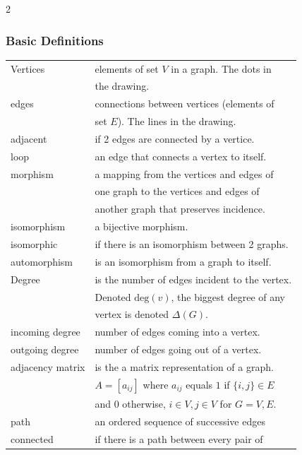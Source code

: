 \documentclass[5pt]{article}
\begin{document}
\begin{multicols}{2}
\subsubsection{Basic Definitions}
\begin{tabular}{ll}
    Vertices            & elements of set $V$ in a graph. The dots in\\
                        & the drawing.\\
    edges               & connections between vertices (elements of\\
                        & set $E$). The lines in the drawing.\\
    adjacent            & if 2 edges are connected by a vertice.\\
    loop                & an edge that connects a vertex to itself.\\
    morphism            & a mapping from the vertices and edges of \\
                        & one graph to the vertices and edges of\\
                        & another graph that preserves incidence.\\
    isomorphism         & a bijective morphism.\\
    isomorphic          & if there is an isomorphism between 2 graphs.\\
    automorphism        & is an isomorphism from a graph to itself.\\
    Degree              & is the number of edges incident to the vertex.\\
                        & Denoted $\text{deg}(v)$, the biggest degree of any\\
                        & vertex is denoted $\Delta(G)$.\\
    incoming degree     & number of edges coming into a vertex.\\
    outgoing degree     & number of edges going out of a vertex.\\
    adjacency matrix    & is the a matrix representation of a graph.\\
                        & $A=[a_{ij}]$ where $a_{ij}$ equals $1$ if $\{i,j\}\in E$\\
                        & and $0$ otherwise, $i\in V, j\in V$ for $G={V,E}$.\\
    path                & an ordered sequence of successive edges\\
    connected           & if there is a path between every pair of\\

\end{tabular}
\end{multicols}
\end{document}
